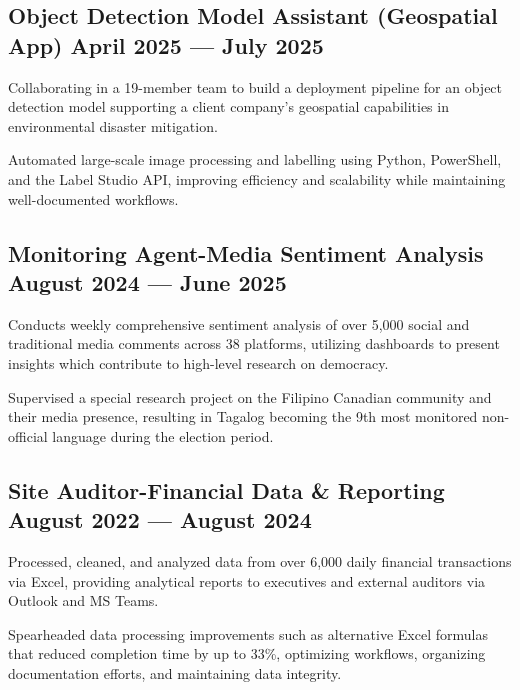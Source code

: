 \subsection{{Object Detection Model Assistant (Geospatial App) \hfill April 2025 --- July 2025}}
\begin{zitemize}
\item Collaborating in a 19-member team to build a deployment pipeline for an object detection model supporting a
client company’s geospatial capabilities in environmental disaster mitigation.
\item Automated large-scale image processing and labelling using Python, PowerShell, and the Label Studio API,
improving efficiency and scalability while maintaining well-documented workflows.
\end{zitemize}

\subsection{{Monitoring Agent-Media Sentiment Analysis \hfill August 2024 --- June 2025}}
\begin{zitemize}
\item Conducts weekly comprehensive sentiment analysis of over 5,000 social and traditional media comments across
38 platforms, utilizing dashboards to present insights which contribute to high-level research on democracy.
\item Supervised a special research project on the Filipino Canadian community and their media presence, resulting
in Tagalog becoming the 9th most monitored non-official language during the election period.
\end{zitemize}

\subsection{{Site Auditor-Financial Data \& Reporting \hfill August 2022 --- August 2024}}
\begin{zitemize}
\item Processed, cleaned, and analyzed data from over 6,000 daily financial transactions via Excel, providing analytical
reports to executives and external auditors via Outlook and MS Teams.
\item Spearheaded data processing improvements such as alternative Excel formulas that reduced completion time by
up to 33\%, optimizing workflows, organizing documentation efforts, and maintaining data integrity.
\end{zitemize}

